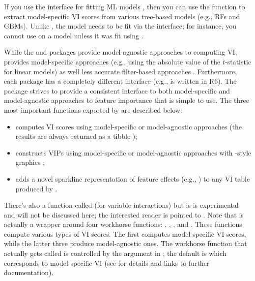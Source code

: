 If you use the  interface for fitting ML models \citep{mlr-pkg}, then you can use the  function to extract model-specific VI scores from various tree-based models (e.g., RFs and GBMs). Unlike , the model needs to be fit via the  interface; for instance, you cannot use  on a  model \citep{gbm-pkg} unless it was fit using .

While the  and  packages provide model-agnostic approaches to computing VI,  provides model-specific approaches (e.g., using the absolute value of the $t$-statistic for linear models) as well less accurate filter-based approaches . Furthermore, each package has a completely different interface (e.g.,  is written in R6). The  package \citep{vip-pkg} strives to provide a consistent interface to both model-specific and model-agnostic approaches to feature importance that is simple to use. The three most important functions exported by  are described below:

\begin{itemize}
 
  \item {} computes VI scores using model-specific or model-agnostic approaches (the results are always returned as a tibble \citep{tibble-pkg});
  
  \item {} constructs VIPs using model-specific or model-agnostic approaches with -style graphics \citep{ggplot2-pkg};
  
  \item {} adds a novel sparkline representation of feature effects (e.g., ) to any VI table produced by .

\end{itemize}

There's also a function called  (for variable interactions) but is is experimental and will not be discussed here; the interested reader is pointed to \citet{greenwell-simple-2018}. Note that  is actually a wrapper around four workhorse functions: , , , and . These functions compute various types of VI scores. The first computes model-specific VI scores, while the latter three produce model-agnostic ones. The workhorse function that actually gets called is controlled by the  argument in ; the default is  which corresponds to model-specific VI (see  for details and links to further documentation). 


